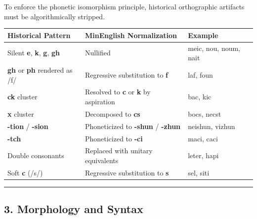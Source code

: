 To enforce the phonetic isomorphism principle, historical orthographic
artifacts must be algorithmically stripped.

{\def\LTcaptype{} %
\begin{longtable}[]{@{}
  >{\raggedright\arraybackslash}p{}
  >{\raggedright\arraybackslash}p{}
  >{\raggedright\arraybackslash}p{}@{}}
\toprule\noalign{}
\begin{minipage}[b]{\linewidth}\raggedright
Historical Pattern
\end{minipage} & \begin{minipage}[b]{\linewidth}\raggedright
MinEnglish Normalization
\end{minipage} & \begin{minipage}[b]{\linewidth}\raggedright
Example
\end{minipage} \\
\midrule\noalign{}
\endhead
\bottomrule\noalign{}
\endlastfoot
Silent \textbf{e}, \textbf{k}, \textbf{g}, \textbf{gh} & Nullified &
meic, nou, noum, nait \\
\textbf{gh} or \textbf{ph} rendered as /f/ & Regressive substitution to
\textbf{f} & laf, foun \\
\textbf{ck} cluster & Resolved to \textbf{c} or \textbf{k} by aspiration
& bac, kic \\
\textbf{x} cluster & Decomposed to \textbf{cs} & bocs, necst \\
\textbf{-tion} / \textbf{-sion} & Phoneticized to \textbf{-shun} /
\textbf{-zhun} & neishun, vizhun \\
\textbf{-tch} & Phoneticized to \textbf{-ci} & maci, caci \\
Double consonants & Replaced with unitary equivalents & leter, hapi \\
Soft \textbf{c} (/s/) & Regressive substitution to \textbf{s} & sel,
siti \\
\end{longtable}
}

\begin{center}\rule{0.5\linewidth}{0.5pt}\end{center}

\newpage

\subsection{3. Morphology and Syntax}\label{morphology-and-syntax}

